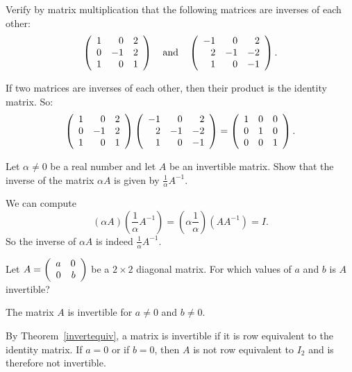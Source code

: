 \documentclass{ximera}
\begin{document}
\begin{exercise} \label{c4.8.1}
Verify by matrix multiplication that the following matrices are inverses
of each other:
\[
\left( \begin{array}{rrr}
1  &  0  &  2\\
0  & -1  &  2\\
1  &  0  &  1
\end{array} \right)\quad\mbox{and}\quad
\left( \begin{array}{rrr}
-1 &   0 &   2\\
 2 &  -1 &  -2\\
 1 &   0 &  -1
\end{array} \right).
\]

\begin{solution}

If two matrices are inverses of each other, then their product is the
identity matrix.  So:
\[ \left(\begin{array}{rrr} 1 & 0 & 2 \\ 0 & -1 & 2 \\ 1 & 0 & 1\end{array}\right)
\left(\begin{array}{rrr} -1 & 0 & 2 \\ 2 & -1 & -2 \\ 1 & 0 & -1\end{array}\right) =
\left(\begin{array}{rrr} 1 & 0 & 0 \\ 0 & 1 & 0 \\ 0 & 0 & 1\end{array}\right). \]

\end{solution}
\end{exercise}

\begin{exercise} \label{c4.8.2}
Let $\alpha \not=0$ be a real number and let $A$ be an invertible
matrix.  Show that the inverse of the matrix $\alpha A$ is given by
$\frac{1}{\alpha}A^{-1}$.

\begin{solution}

We can compute
\[ (\alpha A)\left(\frac{1}{\alpha}A^{-1}\right) =
\left(\alpha\frac{1}{\alpha}\right)(AA^{-1}) = I. \]
So the inverse of $\alpha A$ is indeed $\frac{1}{\alpha}A^{-1}$.

\end{solution}
\end{exercise}

\begin{exercise} \label{c4.8.3}
Let $A=\left(\begin{array}{rr} a & 0\\ 0 &b\end{array}\right)$ be a $2\times 2$ diagonal matrix.
For which values of $a$ and $b$ is $A$ invertible?

\begin{solution}

\ans The matrix $A$ is invertible for $a \neq 0$ and $b \neq 0$.

\soln By Theorem~\ref{invertequiv}, a matrix is invertible if it is row
equivalent to the identity matrix.  If $a = 0$ or if $b = 0$, then
$A$ is not row equivalent to $I_2$ and is therefore not invertible.

\end{solution}
\end{exercise}
\end{document}

